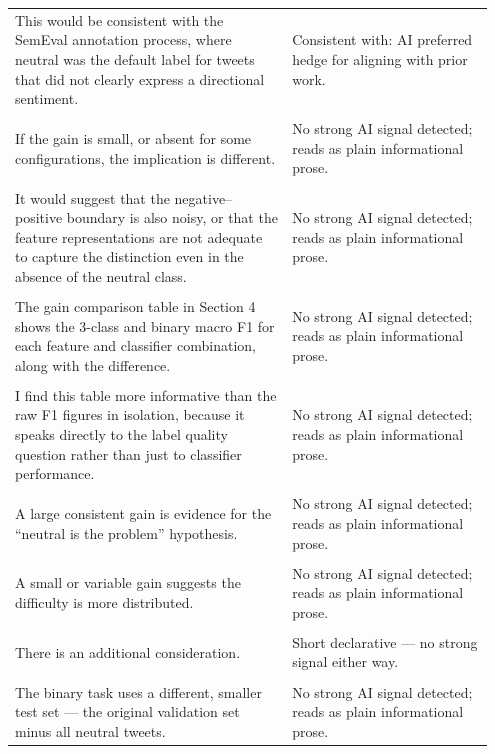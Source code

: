 \documentclass[11pt]{article}
\begin{document}
\begin{longtable}{|p{0.55\linewidth}|p{0.40\linewidth}|}
\hline
\rule{0pt}{3.5cm} & \\
\hline
This would be consistent with the SemEval annotation process, where neutral was the default label for tweets that did not clearly express a directional sentiment. & Consistent with: AI preferred hedge for aligning with prior work. \\[2pt]
\hline
\rule{0pt}{3.5cm} & \\
\hline
If the gain is small, or absent for some configurations, the implication is different. & No strong AI signal detected; reads as plain informational prose. \\[2pt]
\hline
\rule{0pt}{3.5cm} & \\
\hline
It would suggest that the negative--positive boundary is also noisy, or that the feature representations are not adequate to capture the distinction even in the absence of the neutral class. & No strong AI signal detected; reads as plain informational prose. \\[2pt]
\hline
\rule{0pt}{3.5cm} & \\
\hline
The gain comparison table in Section 4 shows the 3-class and binary macro F1 for each feature and classifier combination, along with the difference. & No strong AI signal detected; reads as plain informational prose. \\[2pt]
\hline
\rule{0pt}{3.5cm} & \\
\hline
I find this table more informative than the raw F1 figures in isolation, because it speaks directly to the label quality question rather than just to classifier performance. & No strong AI signal detected; reads as plain informational prose. \\[2pt]
\hline
\rule{0pt}{3.5cm} & \\
\hline
A large consistent gain is evidence for the ``neutral is the problem'' hypothesis. & No strong AI signal detected; reads as plain informational prose. \\[2pt]
\hline
\rule{0pt}{3.5cm} & \\
\hline
A small or variable gain suggests the difficulty is more distributed. & No strong AI signal detected; reads as plain informational prose. \\[2pt]
\hline
\rule{0pt}{3.5cm} & \\
\hline
There is an additional consideration. & Short declarative --- no strong signal either way. \\[2pt]
\hline
\rule{0pt}{3.5cm} & \\
\hline
The binary task uses a different, smaller test set --- the original validation set minus all neutral tweets. & No strong AI signal detected; reads as plain informational prose. \\[2pt]

\end{longtable}
\end{document}
